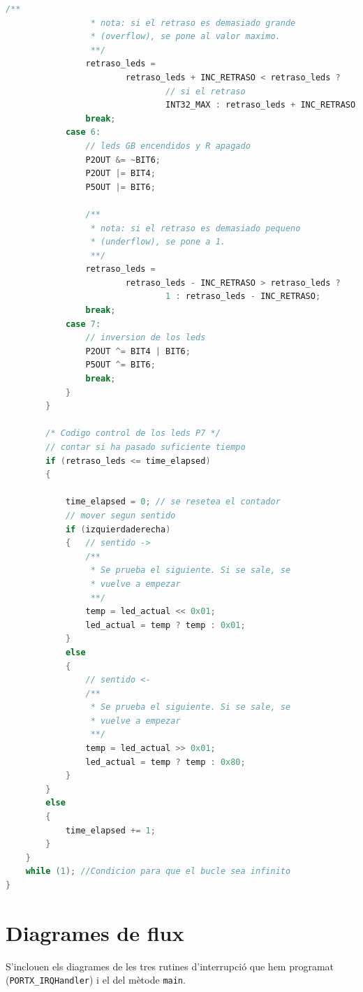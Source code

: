 \documentclass[12pt,a4paper]{article}
\begin{document}
\begin{lstlisting}[language=C]
                /**
                 * nota: si el retraso es demasiado grande
                 * (overflow), se pone al valor maximo.
                 **/
                retraso_leds =
                        retraso_leds + INC_RETRASO < retraso_leds ?
                                // si el retraso
                                INT32_MAX : retraso_leds + INC_RETRASO;
                break;
            case 6:
                // leds GB encendidos y R apagado
                P2OUT &= ~BIT6;
                P2OUT |= BIT4;
                P5OUT |= BIT6;

                /**
                 * nota: si el retraso es demasiado pequeno
                 * (underflow), se pone a 1.
                 **/
                retraso_leds =
                        retraso_leds - INC_RETRASO > retraso_leds ?
                                1 : retraso_leds - INC_RETRASO;
                break;
            case 7:
                // inversion de los leds
                P2OUT ^= BIT4 | BIT6;
                P5OUT ^= BIT6;
                break;
            }
        }

        /* Codigo control de los leds P7 */
        // contar si ha pasado suficiente tiempo
        if (retraso_leds <= time_elapsed)
        {

            time_elapsed = 0; // se resetea el contador
            // mover segun sentido
            if (izquierdaderecha)
            {   // sentido ->
                /**
                 * Se prueba el siguiente. Si se sale, se
                 * vuelve a empezar
                 **/
                temp = led_actual << 0x01;
                led_actual = temp ? temp : 0x01;
            }
            else
            {
                // sentido <-
                /**
                 * Se prueba el siguiente. Si se sale, se
                 * vuelve a empezar
                 **/
                temp = led_actual >> 0x01;
                led_actual = temp ? temp : 0x80;
            }
        }
        else
        {
            time_elapsed += 1;
        }
    }
    while (1); //Condicion para que el bucle sea infinito
}
\end{lstlisting}

\section{Diagrames de flux}

S'inclouen els diagrames de les tres rutines d'interrupció que hem programat
(\texttt{PORTX\_IRQHandler}) i el del mètode \texttt{main}.
\end{document}
